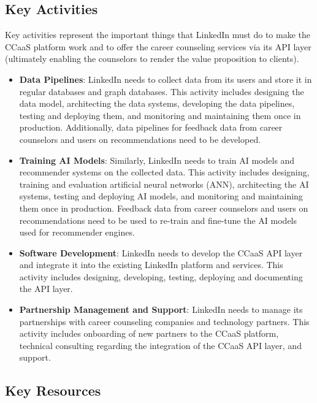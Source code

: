 \subsection{Key Activities}

Key activities represent the important things that LinkedIn must do to make the CCaaS platform work
and to offer the career counseling services via its API layer (ultimately enabling the counselors
to render the value proposition to clients).

\begin{itemize}
    \item \textbf{Data Pipelines}: LinkedIn needs to collect data from its users and store it in
            regular databases and graph databases. This activity includes designing the data model,
            architecting the data systems, developing the data pipelines, testing and deploying them,
            and monitoring and maintaining them once in production. Additionally, data pipelines for
            feedback data from career counselors and users on recommendations need to be developed.
    \item \textbf{Training AI Models}: Similarly, LinkedIn needs to train AI models and recommender
            systems on the collected data. This activity includes designing, training and evaluation
            artificial neural networks (ANN), architecting the AI systems, testing and deploying AI models,
            and monitoring and maintaining them once in production. Feedback data from career counselors
            and users on recommendations need to be used to re-train and fine-tune the AI models used 
            for recommender engines.
    \item \textbf{Software Development}: LinkedIn needs to develop the CCaaS API layer and integrate
            it into the existing LinkedIn platform and services. This activity includes designing, developing,
            testing, deploying and documenting the API layer.
    \item \textbf{Partnership Management and Support}: LinkedIn needs to manage its partnerships with
            career counseling companies and technology partners. This activity includes onboarding of
            new partners to the CCaaS platform, technical consulting regarding the integration of the 
            CCaaS API layer, and support.
\end{itemize}

\subsection{Key Resources}

